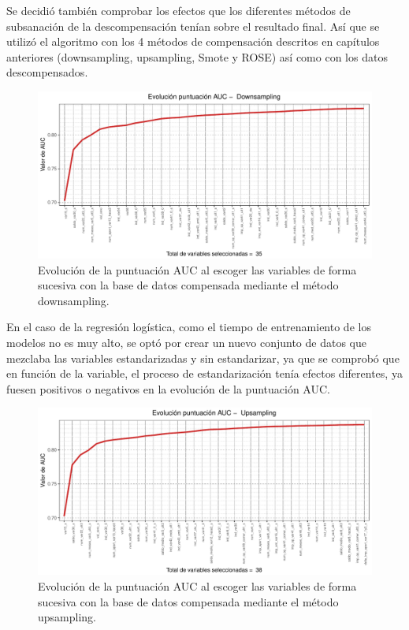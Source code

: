 \documentclass[11pt,a4paper,spanish]{article} %
\begin{document}
Se decidió también comprobar los efectos que los diferentes métodos de subsanación de la descompensación tenían sobre el resultado final. Así que se utilizó el algoritmo con los 4 métodos de compensación descritos en capítulos anteriores (downsampling, upsampling, Smote y ROSE) así como con los datos descompensados. 

\newpage 

\begin{figure}[h!]
	\begin{center}
	\includegraphics[width=\textwidth]{Z_02_02_Downsampling.pdf}
    \caption{Evolución de la puntuación AUC al escoger las variables de forma sucesiva con la base de datos compensada mediante el método downsampling.}
    \end{center}
\end{figure}

En el caso de la regresión logística, como el tiempo de entrenamiento de los modelos no es muy alto, se optó por crear un nuevo conjunto de datos que mezclaba las variables estandarizadas y sin estandarizar, ya que se comprobó que en función de la variable, el proceso de estandarización tenía efectos diferentes, ya fuesen positivos o negativos en la evolución de la puntuación AUC. 

\begin{figure}[h!]
	\begin{center}
	\includegraphics[width=\textwidth]{Z_02_03_Upsampling.pdf}
    \caption{Evolución de la puntuación AUC al escoger las variables de forma sucesiva con la base de datos compensada mediante el método upsampling.}
    \end{center}
\end{figure}
\end{document}
